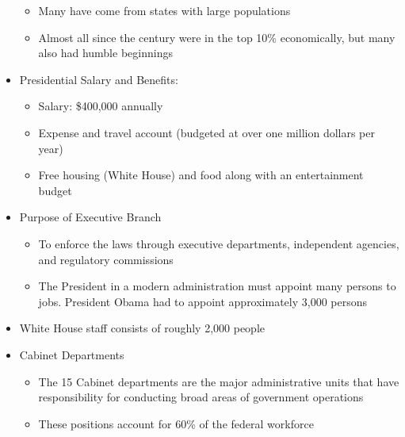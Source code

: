 \documentclass[12pt]{article}
\begin{document}
\begin{itemize}
\begin{itemize}
      \item Many have come from states with large populations

      \item Almost all since the  century were in the top 10\% economically, but many also had humble beginnings

    \end{itemize}

  \item Presidential Salary and Benefits:

    \begin{itemize}

      \item Salary: \$400,000 annually

      \item Expense and travel account (budgeted at over one million dollars per year)

      \item Free housing (White House) and food along with an entertainment budget

    \end{itemize}

  \item Purpose of Executive Branch

    \begin{itemize}

      \item To enforce the laws through executive departments, independent agencies, and regulatory commissions

      \item The President in a modern administration must appoint many persons to jobs. President Obama had to appoint approximately 3,000 persons

    \end{itemize}

  \item White House staff consists of roughly 2,000 people

  \item Cabinet Departments

    \begin{itemize}

      \item The 15 Cabinet departments are the major administrative units that have responsibility for conducting broad areas of government operations

      \item These positions account for 60\% of the federal workforce


\end{itemize}
\end{itemize}
\end{document}
